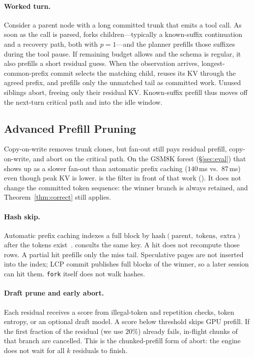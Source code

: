\paragraph{Worked turn.}
Consider a parent node with a long committed trunk that emits a tool call.
As soon as the call is parsed, \sys{} forks children---typically a known-suffix continuation and a recovery path, both with $p{=}1$---and the planner prefills those suffixes during the tool pause.
If remaining budget allows and the schema is regular, it also prefills a short residual guess.
When the observation arrives, longest-common-prefix commit selects the matching child, reuses its KV through the agreed prefix, and prefills only the unmatched tail as committed work.
Unused siblings abort, freeing only their residual KV.
Known-suffix prefill thus moves off the next-turn critical path and into the idle window.

\subsection{Advanced Prefill Pruning}
\label{sec:app}

Copy-on-write removes trunk clones, but fan-out still pays residual prefill, copy-on-write, and abort on the critical path.
On the GSM8K forest (\S\ref{sec:eval}) that shows up as a slower fan-out than automatic prefix caching ($140$\,ms vs.\ $87$\,ms) even though peak KV is lower.
\app is the filter in front of that work ().
It does not change the committed token sequence: the winner branch is always retained, and Theorem~\ref{thm:correct} still applies.

\paragraph{Hash skip.}
Automatic prefix caching indexes a full block by $\mathrm{hash}(\mathrm{parent},\;\mathrm{tokens},\;\mathrm{extra})$ after the tokens exist~\cite{vllm}.
\app consults the same key.
A hit does not recompute those rows.
A partial hit prefills only the miss tail.
Speculative pages are not inserted into the index; LCP commit publishes full blocks of the winner, so a later session can hit them.
\texttt{fork} itself does not walk hashes.

\paragraph{Draft prune and early abort.}
Each residual receives a score from illegal-token and repetition checks, token entropy, or an optional draft model.
A score below threshold skips GPU prefill.
If the first fraction of the residual (we use $20\%$) already fails, in-flight chunks of that branch are cancelled.
This is the chunked-prefill form of abort: the engine does not wait for all $k$ residuals to finish.

